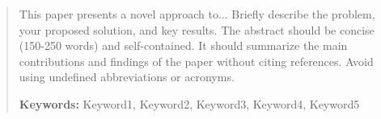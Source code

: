 \begin{abstract}
This paper presents a novel approach to... Briefly describe the problem, your proposed solution, and key results. The abstract should be concise (150-250 words) and self-contained. It should summarize the main contributions and findings of the paper without citing references. Avoid using undefined abbreviations or acronyms.

\textbf{Keywords:} Keyword1, Keyword2, Keyword3, Keyword4, Keyword5
\end{abstract}
